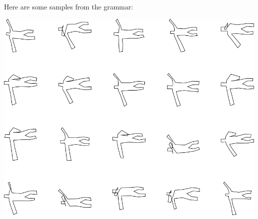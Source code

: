 Here are some samples from the grammar:

\includegraphics[width=6in]{output/3.learning/incremental/gram.8.d/samples.png}

